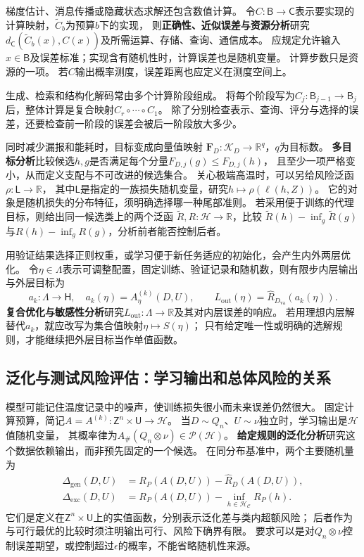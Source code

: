 梯度估计、消息传播或隐藏状态求解还包含数值计算。
令$C:\mathsf B\to\mathsf C$表示要实现的计算映射，$\widetilde C_b$为预算$b$下的实现，
则\textbf{正确性、近似误差与资源分析}研究
$d_{\mathsf C}(\widetilde C_b(x),C(x))$及所需运算、存储、查询、通信成本。
应规定允许输入$x\in\mathsf B$及误差标准；实现含有随机性时，计算误差也是随机变量。
计算步数只是资源的一项。
若$C$输出概率测度，误差距离也应定义在测度空间上。

生成、检索和结构化解码常由多个计算阶段组成。
将每个阶段写为$C_j:\mathsf B_{j-1}\to\mathsf B_j$后，整体计算是复合映射$C_r\circ\cdots\circ C_1$。
除了分别检查表示、查询、评分与选择的误差，还要检查前一阶段的误差会被后一阶段放大多少。

同时减少漏报和能耗时，目标变成向量值映射
$\bm F_D:\mathcal K_D\to\mathbb R^q$，$q$为目标数。
\textbf{多目标分析}比较候选$h,g$是否满足每个分量$F_{D,j}(g)\leq F_{D,j}(h)$，
且至少一项严格变小，从而定义支配与不可改进的候选集合。
关心极端高温时，可以另给风险泛函$\rho:\mathsf L\to\mathbb R$，
其中$\mathsf L$是指定的一族损失随机变量，研究$h\mapsto\rho(\ell(h,Z))$。
它的对象是随机损失的分布特征，须明确选择哪一种尾部准则。
若采用便于训练的代理目标，则给出同一候选类上的两个泛函
$\widetilde R,R:\mathcal H\to\mathbb R$，比较
$\widetilde R(h)-\inf_g\widetilde R(g)$与$R(h)-\inf_gR(g)$，分析前者能否控制后者。

用验证结果选择正则权重，或学习便于新任务适应的初始化，会产生内外两层优化。
令$\eta\in\Lambda$表示可调整配置，固定训练、验证记录和随机数，则有限步内层输出与外层目标为
\[
  a_k:\Lambda\to\mathsf H,\quad a_k(\eta)=A_\eta^{(k)}(D,U),
  \qquad L_{\mathrm{out}}(\eta)=\widehat R_{D_{\mathrm{va}}}(a_k(\eta)).
\]
\textbf{复合优化与敏感性分析}研究$L_{\mathrm{out}}:\Lambda\to\mathbb R$及其对内层误差的响应。
若用理想内层解替代$a_k$，就应改写为集合值映射$\eta\mapsto S(\eta)$；
只有给定唯一性或明确的选解规则，才能继续把外层目标当作单值函数。

\subsection{泛化与测试风险评估：学习输出和总体风险的关系}
\label{sec:future-ml-generalization-evaluation}

模型可能记住温度记录中的噪声，使训练损失很小而未来误差仍然很大。
固定计算预算，简记$A=A^{(k)}:\mathsf Z^n\times\mathsf U\to\mathcal H$。
当$D\sim Q_n$、$U\sim\nu$独立时，学习输出是$\mathcal H$值随机变量，
其概率律为$A_{\#}(Q_n\otimes\nu)\in\mathcal P(\mathcal H)$。
\textbf{给定规则的泛化分析}研究这个数据依赖输出，而非预先固定的一个候选。
在同分布基准中，两个主要随机量为
\[
  \begin{aligned}
    \Delta_{\mathrm{gen}}(D,U)
      &=R_P(A(D,U))-\widehat R_D(A(D,U)),\\
    \Delta_{\mathrm{exc}}(D,U)
      &=R_P(A(D,U))-\inf_{h\in\mathcal H_{\mathcal C}}R_P(h).
  \end{aligned}
\]
它们是定义在$\mathsf Z^n\times\mathsf U$上的实值函数，分别表示泛化差与类内超额风险；
后者作为与可行最优的比较时须注明输出可行、风险下确界有限。
要求可以是对$Q_n\otimes\nu$控制误差期望，或控制超过$\epsilon$的概率，不能省略随机性来源。

